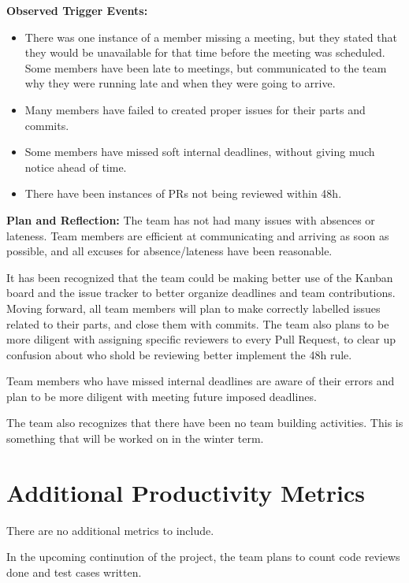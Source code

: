 \documentclass{article}
\begin{document}
\textbf{Observed Trigger Events:}
\begin{itemize}
    \item There was one instance of a member missing a meeting, but they stated that they would be unavailable for that time before the meeting was scheduled. Some members have been late to meetings, but communicated to the team why they were running late and when they were going to arrive.
    \item Many members have failed to created proper issues for their parts and commits.
    \item Some members have missed soft internal deadlines, without giving much notice ahead of time.
    \item There have been instances of PRs not being reviewed within 48h.
\end{itemize}

\textbf{Plan and Reflection:}
The team has not had many issues with absences or lateness. Team members are efficient at communicating
and arriving as soon as possible, and all excuses for absence/lateness have been reasonable.

It has been recognized that the team could be making better use of the Kanban board and the issue
tracker to better organize deadlines and team contributions. Moving forward, all team members will
plan to make correctly labelled issues related to their parts, and close them with commits. The team 
also plans to be more diligent with assigning specific reviewers to every Pull Request, to clear up 
confusion about who shold be reviewing better implement the 48h rule.

Team members who have missed internal deadlines are aware of their errors and plan to be more diligent 
with meeting future imposed deadlines.

The team also recognizes that there have been no team building activities. This is something that 
will be worked on in the winter term.


\section{Additional Productivity Metrics}

There are no additional metrics to include.

In the upcoming continution of the project, the team plans to count code reviews done and test cases written.
\end{document}
